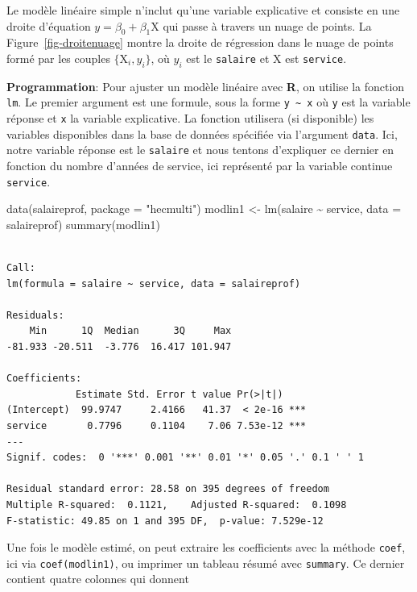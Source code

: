 \documentclass[
  11pt,
  letterpaper,
]{scrbook}
\newenvironment{Shaded}{\begin{snugshade}}{\end{snugshade}}
\newcommand{\AttributeTok}[1]{\textcolor[rgb]{0.40,0.45,0.13}{#1}}
\newcommand{\FunctionTok}[1]{\textcolor[rgb]{0.28,0.35,0.67}{#1}}
\newcommand{\NormalTok}[1]{\textcolor[rgb]{0.00,0.23,0.31}{#1}}
\newcommand{\OtherTok}[1]{\textcolor[rgb]{0.00,0.23,0.31}{#1}}
\newcommand{\SpecialCharTok}[1]{\textcolor[rgb]{0.37,0.37,0.37}{#1}}
\newcommand{\StringTok}[1]{\textcolor[rgb]{0.13,0.47,0.30}{#1}}
\theoremstyle{definition}
\theoremstyle{remark}
\begin{document}
Le modèle linéaire simple n'inclut qu'une variable explicative et
consiste en une droite d'équation \(y=\beta_0 + \beta_1 \mathrm{X}\) qui
passe à travers un nuage de points. La Figure~\ref{fig-droitenuage}
montre la droite de régression dans le nuage de points formé par les
couples \(\{\mathrm{X}_i, y_i\}\), où \(y_i\) est le \texttt{salaire} et
\(\mathrm{X}\) est \texttt{service}.

\textbf{Programmation}: Pour ajuster un modèle linéaire avec \textbf{R},
on utilise la fonction \texttt{lm}. Le premier argument est une formule,
sous la forme \texttt{y\ \textasciitilde{}\ x} où \texttt{y} est la
variable réponse et \texttt{x} la variable explicative. La fonction
utilisera (si disponible) les variables disponibles dans la base de
données spécifiée via l'argument \texttt{data}. Ici, notre variable
réponse est le \texttt{salaire} et nous tentons d'expliquer ce dernier
en fonction du nombre d'années de service, ici représenté par la
variable continue \texttt{service}.

\begin{Shaded}
\begin{Highlighting}[]
\FunctionTok{data}\NormalTok{(salaireprof, }\AttributeTok{package =} \StringTok{"hecmulti"}\NormalTok{)}
\NormalTok{modlin1 }\OtherTok{\textless{}{-}} \FunctionTok{lm}\NormalTok{(salaire }\SpecialCharTok{\textasciitilde{}}\NormalTok{ service, }\AttributeTok{data =}\NormalTok{ salaireprof)}
\FunctionTok{summary}\NormalTok{(modlin1)}
\end{Highlighting}
\end{Shaded}

\begin{verbatim}

Call:
lm(formula = salaire ~ service, data = salaireprof)

Residuals:
    Min      1Q  Median      3Q     Max 
-81.933 -20.511  -3.776  16.417 101.947 

Coefficients:
            Estimate Std. Error t value Pr(>|t|)    
(Intercept)  99.9747     2.4166   41.37  < 2e-16 ***
service       0.7796     0.1104    7.06 7.53e-12 ***
---
Signif. codes:  0 '***' 0.001 '**' 0.01 '*' 0.05 '.' 0.1 ' ' 1

Residual standard error: 28.58 on 395 degrees of freedom
Multiple R-squared:  0.1121,    Adjusted R-squared:  0.1098 
F-statistic: 49.85 on 1 and 395 DF,  p-value: 7.529e-12
\end{verbatim}

Une fois le modèle estimé, on peut extraire les coefficients avec la
méthode \texttt{coef}, ici via \texttt{coef(modlin1)}, ou imprimer un
tableau résumé avec \texttt{summary}. Ce dernier contient quatre
colonnes qui donnent
\end{document}
